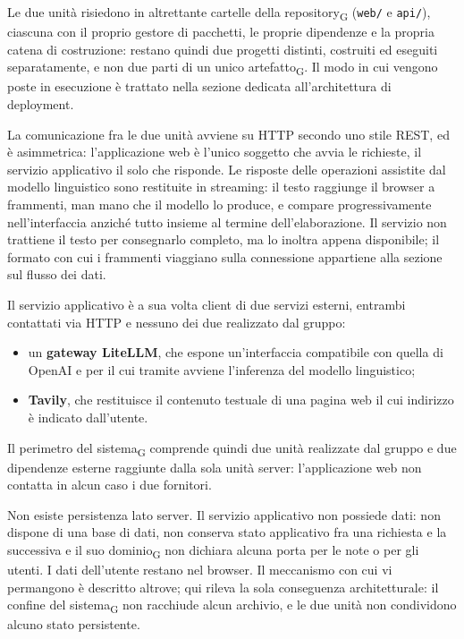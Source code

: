 \documentclass[a4paper, 10pt]{article}
\begin{document}
\noindent Le due unità risiedono in altrettante cartelle della repository\textsubscript{G} (\texttt{web/} e \texttt{api/}), ciascuna con il proprio gestore di pacchetti, le proprie dipendenze e la propria catena di costruzione: restano quindi due progetti distinti, costruiti ed eseguiti separatamente, e non due parti di un unico artefatto\textsubscript{G}. Il modo in cui vengono poste in esecuzione è trattato nella sezione dedicata all'architettura di deployment.

La comunicazione fra le due unità avviene su HTTP secondo uno stile REST, ed è asimmetrica: l'applicazione web è l'unico soggetto che avvia le richieste, il servizio applicativo il solo che risponde. Le risposte delle operazioni assistite dal modello linguistico sono restituite in streaming: il testo raggiunge il browser a frammenti, man mano che il modello lo produce, e compare progressivamente nell'interfaccia anziché tutto insieme al termine dell'elaborazione. Il servizio non trattiene il testo per consegnarlo completo, ma lo inoltra appena disponibile; il formato con cui i frammenti viaggiano sulla connessione appartiene alla sezione sul flusso dei dati.

Il servizio applicativo è a sua volta client di due servizi esterni, entrambi contattati via HTTP e nessuno dei due realizzato dal gruppo:

\begin{itemize}
    \setlength{\itemsep}{0pt}
    \item un \textbf{gateway LiteLLM}, che espone un'interfaccia compatibile con quella di OpenAI e per il cui tramite avviene l'inferenza del modello linguistico;
    \item \textbf{Tavily}, che restituisce il contenuto testuale di una pagina web il cui indirizzo è indicato dall'utente.
\end{itemize}

\noindent Il perimetro del sistema\textsubscript{G} comprende quindi due unità realizzate dal gruppo e due dipendenze esterne raggiunte dalla sola unità server: l'applicazione web non contatta in alcun caso i due fornitori.

Non esiste persistenza lato server. Il servizio applicativo non possiede dati: non dispone di una base di dati, non conserva stato applicativo fra una richiesta e la successiva e il suo dominio\textsubscript{G} non dichiara alcuna porta per le note o per gli utenti. I dati dell'utente restano nel browser. Il meccanismo con cui vi permangono è descritto altrove; qui rileva la sola conseguenza architetturale: il confine del sistema\textsubscript{G} non racchiude alcun archivio, e le due unità non condividono alcuno stato persistente.
\end{document}
